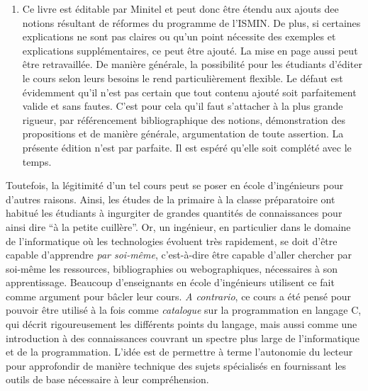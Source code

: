 \documentclass[../main.tex]{subfiles}
\begin{document}
\begin{enumerate}
	\item Ce livre est éditable par Minitel et peut donc être étendu aux ajouts dee notions résultant de réformes du programme de l'ISMIN. De plus, si certaines explications ne sont pas claires ou qu'un point nécessite des exemples et explications supplémentaires, ce peut être ajouté. La mise en page aussi peut être retravaillée. De manière générale, la possibilité pour les étudiants d'éditer le cours selon leurs besoins le rend particulièrement flexible. Le défaut est évidemment qu'il n'est pas certain que tout contenu ajouté soit parfaitement valide et sans fautes. C'est pour cela qu'il faut s'attacher à la plus grande rigueur, par référencement bibliographique des notions, démonstration des propositions et de manière générale, argumentation de toute assertion. La présente édition n'est par parfaite. Il est espéré qu'elle soit complété avec le temps.
\end{enumerate}
Toutefois, la légitimité d'un tel cours peut se poser en école d'ingénieurs pour d'autres raisons. Ainsi, les études de la primaire à la classe préparatoire ont habitué les étudiants à ingurgiter de grandes quantités de connaissances pour ainsi dire ``à la petite cuillère''. Or, un ingénieur, en particulier dans le domaine de l'informatique où les technologies évoluent très rapidement, se doit d'être capable d'apprendre \textit{par soi-même}, c'est-à-dire être capable d'aller chercher par soi-même les ressources, bibliographies ou webographiques, nécessaires à son apprentissage. Beaucoup d'enseignants en école d'ingénieurs utilisent ce fait comme argument pour bâcler leur cours. \textit{A contrario}, ce cours a été pensé pour pouvoir être utilisé à la fois comme \textit{catalogue} sur la programmation en langage C, qui décrit rigoureusement les différents points du langage, mais aussi comme une introduction à des connaissances couvrant un spectre plus large de l'informatique et de la programmation. L'idée est de permettre à terme l'autonomie du lecteur pour approfondir de manière technique des sujets spécialisés en fournissant les outils de base nécessaire à leur compréhension.
\end{document}
